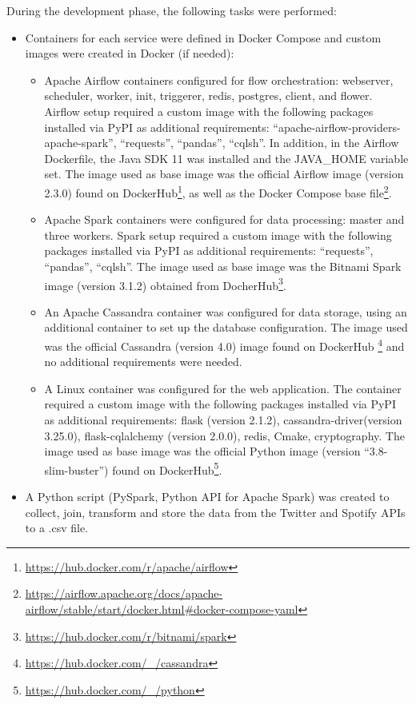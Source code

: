 \nonzeroparskip During the development phase, the following tasks were performed:
\begin{itemize}
	\item Containers for each service were defined in Docker Compose and custom images were created in Docker (if needed):
	\begin{itemize}
		\item Apache Airflow containers configured for flow orchestration: webserver, scheduler, worker, init, triggerer, redis, postgres, client, and flower. Airflow setup required a custom image with the following packages installed via PyPI as additional requirements: ``apache-airflow-providers-apache-spark'', ``requests'', ``pandas'', ``cqlsh''. In addition, in the Airflow Dockerfile, the Java SDK 11 was installed and the JAVA\_HOME variable set. The image used as base image was the official Airflow image (version 2.3.0) found on DockerHub\footnote{\url{https://hub.docker.com/r/apache/airflow}}, as well as the Docker Compose base file\footnote{\url{https://airflow.apache.org/docs/apache-airflow/stable/start/docker.html\#docker-compose-yaml}}.
		\item Apache Spark containers were configured for data processing: master and three workers. Spark setup required a custom image with the following packages installed via PyPI as additional requirements: ``requests'', ``pandas'', ``cqlsh''. The image used as base image was the Bitnami Spark image (version 3.1.2) obtained from DocherHub\footnote{\url{https://hub.docker.com/r/bitnami/spark}}.
		\item An Apache Cassandra container was configured for data storage, using an additional container to set up the database configuration. The image used was the official Cassandra (version 4.0) image found on DockerHub \footnote{\url{https://hub.docker.com/_/cassandra}} and no additional requirements were needed.
		\item A Linux container was configured for the web application. The container required a custom image with the following packages installed via PyPI as additional requirements: flask (version 2.1.2), cassandra-driver(version 3.25.0), flask-cqlalchemy (version 2.0.0), redis, Cmake, cryptography. The image used as base image was the official Python image (version ``3.8-slim-buster'') found on DockerHub\footnote{\url{https://hub.docker.com/_/python}}.
	\end{itemize}
	\item A Python script (PySpark, Python API for Apache Spark) was created to collect, join, transform and store the data from the Twitter and Spotify APIs to a .csv file.

\end{itemize}
